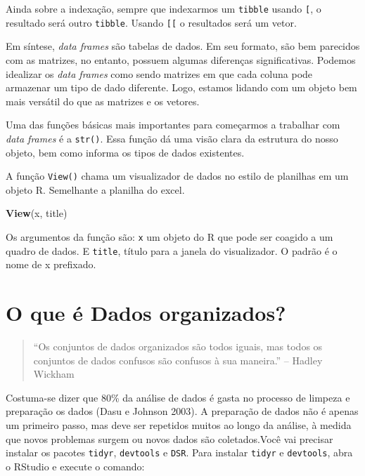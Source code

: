 \documentclass[a4paper]{book}
\newenvironment{Shaded}{\begin{snugshade}}{\end{snugshade}}
\newcommand{\KeywordTok}[1]{\textcolor[rgb]{0.13,0.29,0.53}{\textbf{#1}}}
\newcommand{\NormalTok}[1]{#1}
\begin{document}
Ainda sobre a indexação, sempre que indexarmos um \texttt{tibble} usando \texttt{{[}}, o resultado será outro \texttt{tibble}. Usando \texttt{{[}{[}} o resultados será um vetor.

Em síntese, \emph{data frames} são tabelas de dados. Em seu formato, são bem parecidos com as matrizes, no entanto, possuem algumas diferenças significativas. Podemos idealizar os \emph{data frames} como sendo matrizes em que cada coluna pode armazenar um tipo de dado diferente. Logo, estamos lidando com um objeto bem mais versátil do que as matrizes e os vetores.

Uma das funções básicas mais importantes para começarmos a trabalhar com \emph{data frames} é a \texttt{str()}. Essa função dá uma visão clara da estrutura do nosso objeto, bem como informa os tipos de dados existentes.

A função \texttt{View()} chama um visualizador de dados no estilo de planilhas em um objeto R. Semelhante a planilha do excel.

\begin{Shaded}
\begin{Highlighting}[]
\KeywordTok{View}\NormalTok{(x, title)}
\end{Highlighting}
\end{Shaded}

Os argumentos da função são: \texttt{x} um objeto do R que pode ser coagido a um quadro de dados. E \texttt{title}, título para a janela do visualizador. O padrão é o nome de x prefixado.

\hypertarget{o-que-uxe9-dados-organizados}{%
\section{O que é Dados organizados?}\label{o-que-uxe9-dados-organizados}}

\begin{quote}
``Os conjuntos de dados organizados são todos iguais, mas todos os conjuntos de dados confusos são confusos à sua maneira.'' -- Hadley Wickham
\end{quote}

Costuma-se dizer que 80\% da análise de dados é gasta no processo de limpeza e preparação os dados (Dasu e Johnson 2003). A preparação de dados não é apenas um primeiro passo, mas deve ser repetidos muitos ao longo da análise, à medida que novos problemas surgem ou novos dados são coletados.Você vai precisar instalar os pacotes \texttt{tidyr}, \texttt{devtools} e \texttt{DSR}. Para instalar \texttt{tidyr} e \texttt{devtools}, abra o RStudio e execute o comando:
\end{document}
